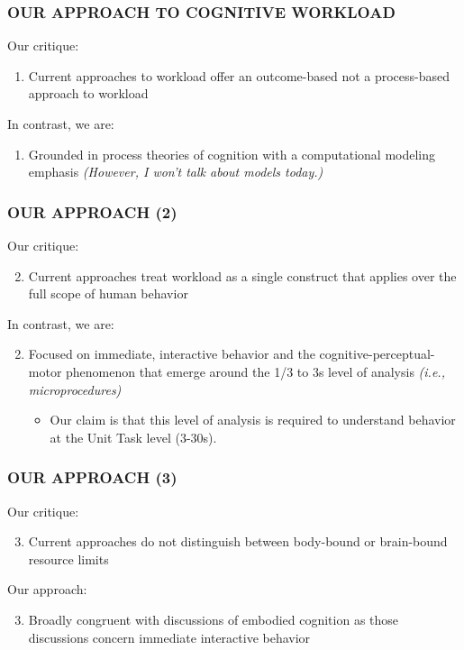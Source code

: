 \documentclass{beamer}
\begin{document}
\begin{frame}
	\frametitle{OUR APPROACH TO COGNITIVE WORKLOAD}
Our critique:
	\begin{enumerate}
		\item Current approaches to workload offer an outcome-based not a process-based approach to workload
	\end{enumerate}
	\pause
In contrast, we are:
	\begin{enumerate}
		\item Grounded in process theories of cognition with a computational modeling emphasis \emph{(However, I won't talk about models today.)}
	\end{enumerate}
\end{frame}

\begin{frame}
	\frametitle{OUR APPROACH (2)}
Our critique:
	\begin{enumerate}
		\setcounter{enumi}{1}
		\item Current approaches treat workload as a single construct that applies over the full scope of human behavior
	\end{enumerate}
	\pause
In contrast, we are:
	\begin{enumerate}
		\setcounter{enumi}{1}
		\item Focused on immediate, interactive behavior and the cognitive-perceptual-motor phenomenon that emerge around the 1/3 to 3s level of analysis \emph{(i.e., microprocedures)}
		\begin{itemize}
			\item Our claim is that this level of analysis is required to understand behavior at the Unit Task level \parencite{cmn1983} (3-30s).
		\end{itemize}
	\end{enumerate}
\end{frame}


\begin{frame}
	\frametitle{OUR APPROACH (3)}
Our critique:
	\begin{enumerate}
		\setcounter{enumi}{2}
		\item Current approaches do not distinguish between body-bound or brain-bound resource limits
	\end{enumerate}
\pause
Our approach: 
	\begin{enumerate}
		\setcounter{enumi}{2}
		\item Broadly congruent with discussions of embodied cognition \parencite{clark08,rupert10,km97} as those discussions concern immediate interactive behavior
	\end{enumerate}
\end{frame}
\end{document}

